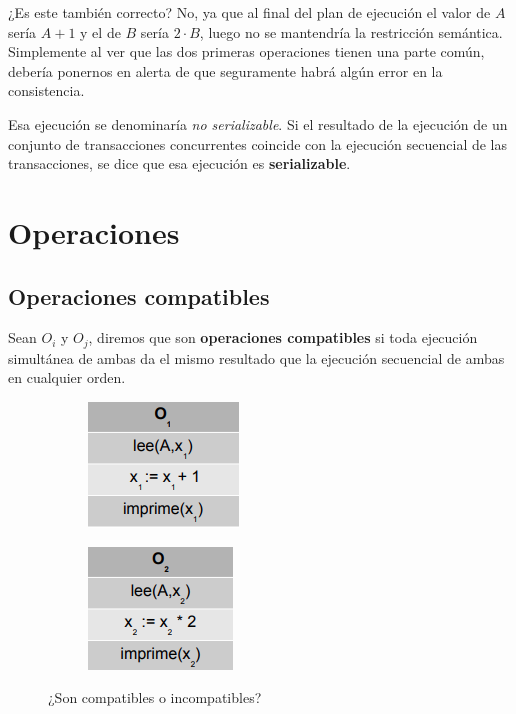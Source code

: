¿Es este también correcto? No, ya que al final del plan de ejecución el valor de $A$ sería $A+1$ y el de $B$ sería $2\cdot B$, luego no se mantendría la restricción semántica. Simplemente al ver que las dos primeras operaciones tienen una parte común, debería ponernos en alerta de que seguramente habrá algún error en la consistencia.

Esa ejecución se denominaría \textit{no serializable}. Si el resultado de la ejecución de un conjunto de transacciones concurrentes coincide con la ejecución secuencial de las transacciones, se dice que esa ejecución es \textbf{serializable}.

\section{Operaciones}

\subsection{Operaciones compatibles}

Sean $O_i$ y $O_j$, diremos que son \textbf{operaciones compatibles} si toda ejecución simultánea de ambas da el mismo resultado que la ejecución secuencial de ambas en cualquier orden.

\begin{figure}[H]
\centering
\begin{subfigure}{.5\textwidth}
  \centering
  \includegraphics[width=.4\linewidth]{img/29.png}
\end{subfigure}%
\begin{subfigure}{.5\textwidth}
  \centering
  \includegraphics[width=.4\linewidth]{img/30.png}
\end{subfigure}
\caption{¿Son compatibles o incompatibles?}
\end{figure}

